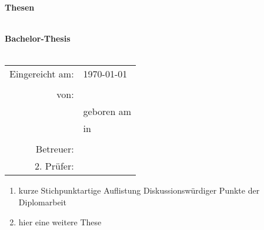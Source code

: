 
\newpage
\hypertarget{Thesen}{}
\thispagestyle{empty}						%
\begin{large}
	\textbf{Thesen} \\ \\
\end{large}
\textbf{Bachelor-Thesis} \\
\textbf{\Titel} \\
\begin{table}[htp]
		\begin{tabular}{rl}
			Eingereicht am: & \today \\
				\\
				von: & \Verfasser \\
				& geboren am \Geburtstag \\
				& in \Geburtsort \\
				\: & \Betreuer \\
				2. Prüfer: & \ZweitBetreuer
		\end{tabular}
\end{table}
\begin{enumerate}
	\item kurze Stichpunktartige Auflistung Diskussionswürdiger Punkte der Diplomarbeit
	\item hier eine weitere These
\end{enumerate}
